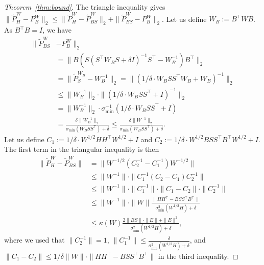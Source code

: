 \documentclass[letterpaper, 10 pt, conference]{ieeeconf}
\begin{document}
\begin{proof}[Theorem~\ref{thm:bound}]
    The triangle inequality gives $\|\tilde{P}^W_H - P^W_B\|_2 \leq \|\tilde{P}^W_H - \tilde{P}^W_{BS}\|_2 + \|\tilde{P}_{BS}^W - P_B^W\|_2$. Let us define $W_B := B^\top W B$. As $B^\top B =I$, we have
    \begin{align*}
    \|\tilde{P}_{BS}^W & - P_B^W\|_2 \\
    & = \|B\left(S(S^\top W_B S+\delta I)^{-1}S^\top - W_B^{-1}\right)B^\top\|_2 \\ 
    & = \|\tilde{P}_S^{W_B} - W_B^{-1}\|_2 = \|(1/\delta \cdot W_BSS^\top W_B + W_B)^{-1}\|_2 \\
    & \leq \|W_B^{-1}\|_2\cdot \|(1/\delta \cdot W_BSS^\top + I)^{-1}\|_2\\
    & = \|W_B^{-1}\|_2 \cdot \sigma_\mathrm{min}^{-1}(1/\delta \cdot W_B SS^\top + I) \\
    & = \frac{\delta \|W_B^{-1}\|_2}{\sigma_\mathrm{min}(W_B SS^\top ) + \delta} 
    \leq \frac{\delta \|W^{-1}\|_2}{\sigma_\mathrm{min}(W_B SS^\top ) + \delta}.
    \end{align*}
    Let us define $C_1 :=1/\delta\cdot W^{1/2}HH^\top W^{1/2}+I$ and $C_2:= 1/\delta\cdot W^{1/2}BSS^\top B^\top W^{1/2}+I$. The first term in the triangular inequality is then
    \begin{align*}
    \|\tilde{P}_H^W -  \tilde{P}_{BS}^W\| &= \|W^{-1/2}(C_2^{-1} - C_1^{-1})W^{-1/2}\| \\
    & \leq \|W^{-1}\| \cdot \|C_1^{-1}(C_2 - C_1)C_2^{-1}\| \\
    & \leq \|W^{-1}\| \cdot \|C_1^{-1}\|\cdot \|C_1 - C_2\|\cdot \|C_2^{-1}\| \\
    & \leq \|W^{-1}\|\cdot\|W\|\frac{\|HH^\top - BSS^\top B^\top\|}{\sigma^2_\mathrm{min}(W^{1/2}H) + \delta} \\
    & \leq \kappa(W) \frac{2\|BS\|\cdot\|E\| + \|E\|^2}{\sigma_\mathrm{min}^2(W^{1/2}H) + \delta},
    \end{align*}
    where we used that $\|C_2^{-1}\| = 1$, $\|C_1^{-1}\| \leq \frac{\delta}{\sigma_\mathrm{min}^2(W^{1/2}H) + \delta}$, and $\|C_1-C_2\|\leq 1/\delta \|W\|\cdot\|HH^\top - BSS^\top B^\top\|$ in the third inequality.
\end{proof}

        

\end{document}
